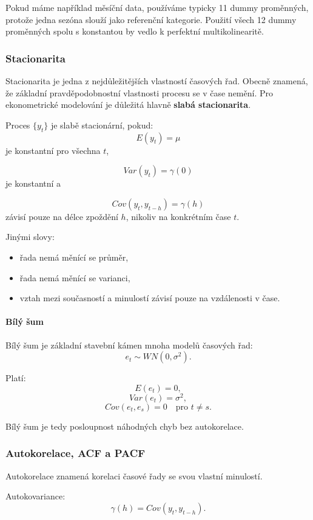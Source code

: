 Pokud máme například měsíční data, používáme typicky 11 dummy proměnných, protože jedna sezóna
slouží jako referenční kategorie. Použití všech 12 dummy proměnných spolu s konstantou by vedlo
k perfektní multikolinearitě.

\subsubsection{Stacionarita}

Stacionarita je jedna z nejdůležitějších vlastností časových řad. Obecně znamená, že základní
pravděpodobnostní vlastnosti procesu se v čase nemění. Pro ekonometrické modelování je důležitá
hlavně \textbf{slabá stacionarita}.

Proces $\{y_t\}$ je slabě stacionární, pokud:
\[
    E(y_t)=\mu
\]
je konstantní pro všechna $t$,

\[
    Var(y_t)=\gamma(0)
\]
je konstantní a

\[
    Cov(y_t,y_{t-h})=\gamma(h)
\]
závisí pouze na délce zpoždění $h$, nikoliv na konkrétním čase $t$.

Jinými slovy:
\begin{itemize}
    \item řada nemá měnící se průměr,
    \item řada nemá měnící se varianci,
    \item vztah mezi současností a minulostí závisí pouze na vzdálenosti v čase.
\end{itemize}

\paragraph{Bílý šum}

Bílý šum je základní stavební kámen mnoha modelů časových řad:
\[
    e_t \sim WN(0,\sigma^2).
\]

Platí:
\[
    E(e_t)=0,
\]
\[
    Var(e_t)=\sigma^2,
\]
\[
    Cov(e_t,e_s)=0 \quad \text{pro } t\neq s.
\]

Bílý šum je tedy posloupnost náhodných chyb bez autokorelace.

\subsubsection{Autokorelace, ACF a PACF}

Autokorelace znamená korelaci časové řady se svou vlastní minulostí.

Autokovariance:
\[
    \gamma(h)=Cov(y_t,y_{t-h}).
\]

